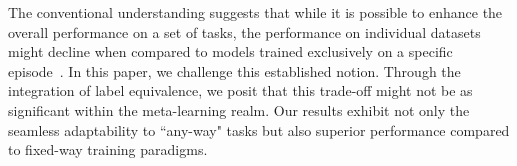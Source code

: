 \documentclass[letterpaper]{article} %
\newcommand{\jh}[1]{\textcolor{black}{#1}}
\newcommand{\yr}[1]{\textcolor{black}{#1}}
\begin{document}
The conventional understanding suggests that while it is possible to enhance the overall performance on a set of tasks, the performance on individual datasets might decline %
when compared to models trained exclusively %
on a specific episode~\cite{DG:wisdom0,DG:wisdom1,DG:wisdom2}. In this paper, we challenge this established notion. %
Through the integration of label equivalence, we posit that this trade-off might not be as significant %
within the meta-learning realm. Our results exhibit not only the seamless adaptability to ``any-way" tasks but also superior performance compared to fixed-way training paradigms.

\end{document}
